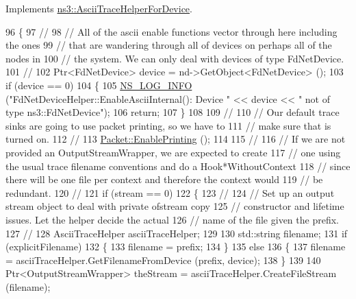 Implements \hyperlink{classns3_1_1AsciiTraceHelperForDevice_ab0eb42de1633994e75f4a4fd44bc79de}{ns3\+::\+Ascii\+Trace\+Helper\+For\+Device}.


\begin{DoxyCode}
96 \{
97   \textcolor{comment}{//}
98   \textcolor{comment}{// All of the ascii enable functions vector through here including the ones}
99   \textcolor{comment}{// that are wandering through all of devices on perhaps all of the nodes in}
100   \textcolor{comment}{// the system.  We can only deal with devices of type FdNetDevice.}
101   \textcolor{comment}{//}
102   Ptr<FdNetDevice> device = nd->GetObject<FdNetDevice> ();
103   \textcolor{keywordflow}{if} (device == 0)
104     \{
105       \hyperlink{group__logging_gafbd73ee2cf9f26b319f49086d8e860fb}{NS\_LOG\_INFO} (\textcolor{stringliteral}{"FdNetDeviceHelper::EnableAsciiInternal(): Device "} << device << \textcolor{stringliteral}{" not of
       type ns3::FdNetDevice"});
106       \textcolor{keywordflow}{return};
107     \}
108 
109   \textcolor{comment}{//}
110   \textcolor{comment}{// Our default trace sinks are going to use packet printing, so we have to}
111   \textcolor{comment}{// make sure that is turned on.}
112   \textcolor{comment}{//}
113   \hyperlink{classns3_1_1Packet_ae17c0cd8e63e83df3c9273801e3d5d7f}{Packet::EnablePrinting} ();
114 
115   \textcolor{comment}{//}
116   \textcolor{comment}{// If we are not provided an OutputStreamWrapper, we are expected to create}
117   \textcolor{comment}{// one using the usual trace filename conventions and do a Hook*WithoutContext}
118   \textcolor{comment}{// since there will be one file per context and therefore the context would}
119   \textcolor{comment}{// be redundant.}
120   \textcolor{comment}{//}
121   \textcolor{keywordflow}{if} (stream == 0)
122     \{
123       \textcolor{comment}{//}
124       \textcolor{comment}{// Set up an output stream object to deal with private ofstream copy}
125       \textcolor{comment}{// constructor and lifetime issues.  Let the helper decide the actual}
126       \textcolor{comment}{// name of the file given the prefix.}
127       \textcolor{comment}{//}
128       AsciiTraceHelper asciiTraceHelper;
129 
130       std::string filename;
131       \textcolor{keywordflow}{if} (explicitFilename)
132         \{
133           filename = prefix;
134         \}
135       \textcolor{keywordflow}{else}
136         \{
137           filename = asciiTraceHelper.GetFilenameFromDevice (prefix, device);
138         \}
139 
140       Ptr<OutputStreamWrapper> theStream = asciiTraceHelper.CreateFileStream (filename);

\end{DoxyCode}
